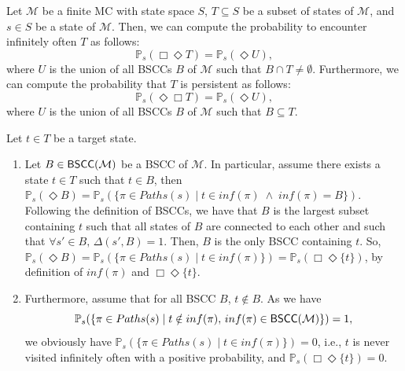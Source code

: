 \begin{corollary}
  Let $\mathcal{M}$ be a finite MC with state space $S$, $T \subseteq S$ be a subset of states of $\mathcal{M}$, and $s \in S$ be a state of $\mathcal{M}$.
  Then, we can compute the probability to encounter infinitely often $T$ as follows:
  \[
    \mathbb{P}_s(\Box \Diamond T) = \mathbb{P}_s(\Diamond U),
  \]
  where $U$ is the union of all BSCCs $B$ of $\mathcal{M}$ such that $B \cap T \neq \emptyset$. Furthermore, we can compute the probability that $T$ is persistent as follows:
  \[
    \mathbb{P}_s(\Diamond \Box T) = \mathbb{P}_s(\Diamond U),
  \]
  where $U$ is the union of all BSCCs $B$ of $\mathcal{M}$ such that $B \subseteq T$.
\end{corollary}

\begin{proof2} Let $t \in T$ be a target state.
\begin{enumerate}
\item
Let $B \in \textnormal{\sffamily BSCC}(\mathcal{M})$ be a BSCC of $\mathcal{M}$.
In particular, assume there exists a state $t \in T$ such that $t \in B$, then $\mathbb{P}_s(\Diamond B) = \mathbb{P}_s(\{ \pi \in Paths(s) \; | \; t \in inf(\pi) \; \wedge \; inf(\pi) = B \})$. Following the definition of BSCCs, we have that $B$ is the largest subset containing $t$ such that all states of $B$ are connected to each other and such that $\forall s' \in B, \, \Delta(s', B)=1$. Then, $B$ is the only BSCC containing $t$. So,
$\mathbb{P}_s(\Diamond B) = \mathbb{P}_s(\{ \pi \in Paths(s) \; | \; t \in inf(\pi)\}) = \mathbb{P}_s(\Box \Diamond \{t\})$,
by definition of $inf(\pi)$ and $\Box\Diamond \{t\}$.
\label{B1}
\item
Furthermore, assume that for all BSCC $B$, $t \notin B$. As we have \[\mathbb{P}_s(\{\pi \in Paths(s)\; | \; t \notin inf(\pi), \, inf(\pi) \in \textnormal{\sffamily BSCC}(\mathcal{M})\}) = 1,\]
we obviously have $\mathbb{P}_s(\{\pi \in Paths(s)\; | \; t \in inf(\pi)\}) = 0$, i.e., $t$ is never visited infinitely often with a positive probability, and $\mathbb{P}_s(\Box\Diamond \{t\}) = 0$.
\label{B2}
\end{enumerate}

\end{proof2}
